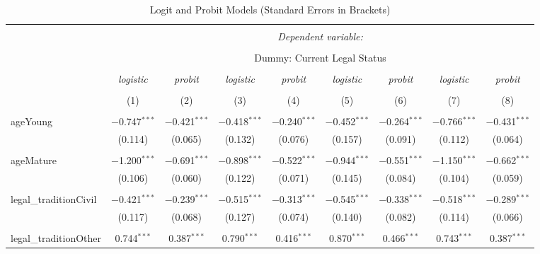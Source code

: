 \documentclass[a4paper, nobind]{templates/ociamthesis}
\begin{document}
\newpage

\begin{landscape}

\begin{table}[!htbp] \centering 
  \caption{Logit and Probit Models (Standard Errors in Brackets)} 
  \label{} 
\footnotesize 
\begin{tabular}{@{\extracolsep{5pt}}lcccccccc} 
\\[-1.8ex]\hline 
\hline \\[-1.8ex] 
 & \multicolumn{8}{c}{\textit{Dependent variable:}} \\ 
\cline{2-9} 
\\[-1.8ex] & \multicolumn{8}{c}{Dummy: Current Legal Status} \\ 
\\[-1.8ex] & \textit{logistic} & \textit{probit} & \textit{logistic} & \textit{probit} & \textit{logistic} & \textit{probit} & \textit{logistic} & \textit{probit} \\ 
\\[-1.8ex] & (1) & (2) & (3) & (4) & (5) & (6) & (7) & (8)\\ 
\hline \\[-1.8ex] 
 ageYoung & $-$0.747$^{***}$ & $-$0.421$^{***}$ & $-$0.418$^{***}$ & $-$0.240$^{***}$ & $-$0.452$^{***}$ & $-$0.264$^{***}$ & $-$0.766$^{***}$ & $-$0.431$^{***}$ \\ 
  & (0.114) & (0.065) & (0.132) & (0.076) & (0.157) & (0.091) & (0.112) & (0.064) \\ 
  & & & & & & & & \\ 
 ageMature & $-$1.200$^{***}$ & $-$0.691$^{***}$ & $-$0.898$^{***}$ & $-$0.522$^{***}$ & $-$0.944$^{***}$ & $-$0.551$^{***}$ & $-$1.150$^{***}$ & $-$0.662$^{***}$ \\ 
  & (0.106) & (0.060) & (0.122) & (0.071) & (0.145) & (0.084) & (0.104) & (0.059) \\ 
  & & & & & & & & \\ 
 legal\_traditionCivil & $-$0.421$^{***}$ & $-$0.239$^{***}$ & $-$0.515$^{***}$ & $-$0.313$^{***}$ & $-$0.545$^{***}$ & $-$0.338$^{***}$ & $-$0.518$^{***}$ & $-$0.289$^{***}$ \\ 
  & (0.117) & (0.068) & (0.127) & (0.074) & (0.140) & (0.082) & (0.114) & (0.066) \\ 
  & & & & & & & & \\ 
 legal\_traditionOther & 0.744$^{***}$ & 0.387$^{***}$ & 0.790$^{***}$ & 0.416$^{***}$ & 0.870$^{***}$ & 0.466$^{***}$ & 0.743$^{***}$ & 0.387$^{***}$ \\ 

\end{tabular}
\end{table}
\end{landscape}
\end{document}
